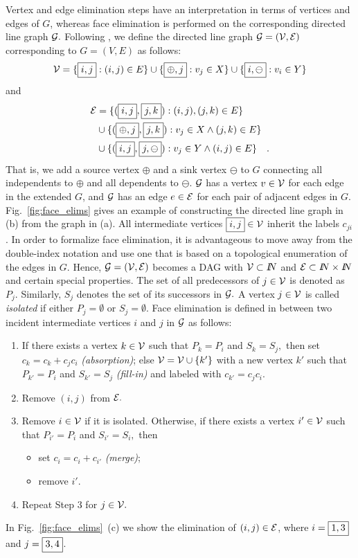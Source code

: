 \documentclass[11pt]{article}
\newcommand{\reffig}[1]{{Fig.~\ref{#1}}}
\begin{document}
Vertex and edge elimination steps have an 
interpretation in terms of vertices and edges
of $G$, whereas face elimination is performed on 
the corresponding directed line graph $\cal G.$
Following \cite{ElimTechMP}, we define the directed line graph $\cal G=(V,E)$ 
corresponding to $G=(V,E)$ as follows:
$${\cal V}=
\{\framebox{$i,j$} : (i,j)\in E\} \cup 
\{\framebox{$\oplus,j$}:v_j \in X\} \cup 
\{\framebox{$i,\ominus$}:v_i \in Y\}$$ and 
\begin{align*}
{\cal E}&=\{(\framebox{$i,j$},\framebox{$j,k$}): (i,j),(j,k) \in E\} \\
&\cup \{(\framebox{$\oplus,j$},\framebox{$j,k$}): v_j\in X \land (j,k)\in E\} \\
&\cup \{(\framebox{$i,j$},\framebox{$j,\ominus$}): v_j\in Y \land (i,j)\in E\} 
\quad . \\
\end{align*}
That is, 
we add a source vertex $\oplus$ and a sink vertex 
$\ominus$ to $G$ connecting all independents to $\oplus$
and all dependents to $\ominus$. $\cal G$ has   
a vertex $ v \in \cal V$ for each edge in the extended $G$, 
and $\cal G$ has an edge $ e \in \cal E$ for each 
pair of adjacent edges in $G$. \reffig{fig:face_elims} gives an 
example of constructing the directed line graph in (b) from the graph in (a).   
All intermediate vertices $\framebox{$i,j$} \in \cal V$ inherit the labels  
$c_{ji}$. In order to formalize face elimination, it is advantageous to move away
from the double-index notation and use one that is based on a topological
enumeration of the edges in $G.$ Hence, ${\cal G}=({\cal V}, {\cal E})$ 
becomes a DAG with ${\cal V} \subset I\!\!N$ and
${\cal E} \subset I\!\!N \times I\!\!N$ and
certain special properties.
The set of all predecessors of $j \in {\cal V}$ is denoted as $P_j.$ 
Similarly, $S_j$ denotes the set of its successors in $\cal G.$ 
A vertex 
$j \in \cal V$ is called {\em isolated} if either 
$P_j=\emptyset$ or
$S_j=\emptyset.$ 
Face elimination is defined in \cite{ElimTechMP}
between two incident intermediate vertices $i$ and $j$ in $\cal G$ as follows:
\begin{enumerate}
\item If there exists a vertex $k \in \cal V$ such that $P_k = P_i$ and
$S_k = S_j,$ then
set $c_k = c_k + c_j c_i$ {\em (absorption)};
else ${\cal V}={\cal V} \cup \{k'\}$ with a new vertex $k'$ such that
$P_{k'} = P_i$ and $S_{k'} = S_j$
{\em (fill-in)} and labeled with $c_{k'} = c_j c_i.$
\item Remove $(i,j)$ from $\cal E.$
\item Remove $i \in \cal V$ if it is isolated. Otherwise, if there exists a vertex $i' \in \cal V$ such that
$P_{i'} = P_i$ and $S_{i'} = S_i,$ then
\begin{itemize}
\item set $c_i=c_i + c_{i'}$ {\em (merge)};
\item remove $i'.$
\end{itemize}
\item Repeat Step 3 for $j \in \cal V.$
\end{enumerate}
In \reffig{fig:face_elims}~(c) we show the elimination of $(i,j) \in \cal E$,
where $i=\framebox{$1,3$}$ and $j=\framebox{$3,4$}$.
\end{document}
